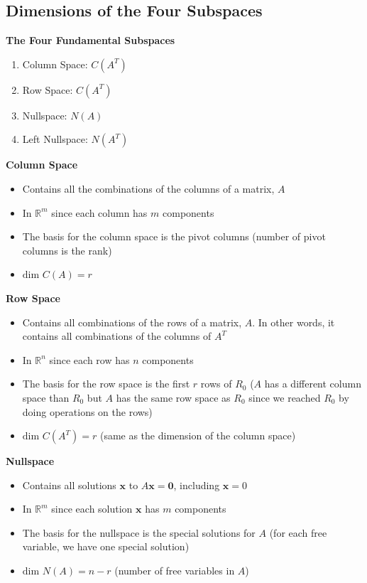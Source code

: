 \documentclass[11pt]{article}
\begin{document}
\subsection{Dimensions of the Four Subspaces}

\textbf{The Four Fundamental Subspaces}
\begin{enumerate}
    \item Column Space: $C(A^T)$
    \item Row Space: $C(A^T)$
    \item Nullspace: $N(A)$
    \item Left Nullspace: $N(A^T)$
\end{enumerate}

\textbf{Column Space}
\begin{itemize}
    \item Contains all the combinations of the columns of a matrix, $A$
    \item In $\mathbb{R}^m$ since each column has $m$ components
    \item The basis for the column space is the pivot columns (number of pivot columns is the 
    rank)
    \item $\text{dim }C(A)=r$
\end{itemize}

\textbf{Row Space}
\begin{itemize}
    \item Contains all combinations of the rows of a matrix, $A$. In other words, it contains 
    all combinations of the columns of $A^T$
    \item In $\mathbb{R}^n$ since each row has $n$ components
    \item The basis for the row space is the first $r$ rows of $R_0$ ($A$ has a different 
    column space than $R_0$ but $A$ has the same row space as $R_0$ since we reached $R_0$ by 
    doing operations on the rows)
    \item $\text{dim }C(A^T)=r$ (same as the dimension of the column space)
\end{itemize}

\textbf{Nullspace}
\begin{itemize}
    \item Contains all solutions $\boldsymbol{x}$ to $A\boldsymbol{x} = \boldsymbol{0}$, 
    including $\boldsymbol{x} = 0$
    \item In $\mathbb{R}^m$ since each solution $\boldsymbol{x}$ has $m$ components
    \item The basis for the nullspace is the special solutions for $A$ (for each free variable, 
    we have one special solution)
    \item $\text{dim }N(A)=n-r$ (number of free variables in $A$)
\end{itemize}
\end{document}
